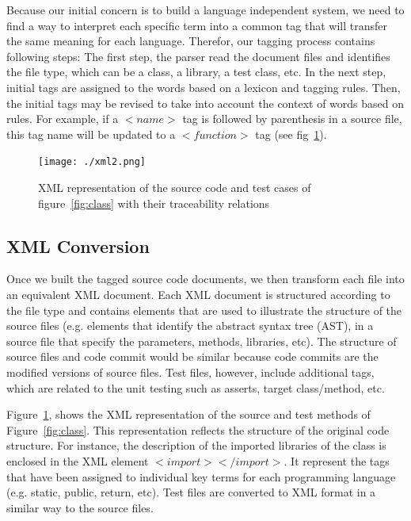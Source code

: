 Because our initial concern is to build a language independent 
system, we need to find a way to interpret each specific term 
into a common tag that will transfer the same meaning for each language. 
Therefor, our tagging process contains following steps:
The first step, the parser read the document files and identifies 
the file type, which can be a class, a library, a test class, etc.
In the next step, initial tags are assigned to the words based on
a lexicon and tagging rules. Then, the initial tags may be revised to 
take into account the context of words based on rules.  
For example, if a $<name>$ tag is followed by parenthesis in a
source file, this tag name will be updated to a $<function>$ tag
(see fig~\ref{fig:xml}).


\begin{figure}[!ht]
	\centering
	\texttt{[image: ./xml2.png]}
	\vspace*{-3pt}
	\caption{XML representation of the source code and test 
		cases of figure~\ref{fig:class} with their traceability relations}
	\label{fig:xml}
\end{figure}


\subsection{XML Conversion}

Once we built the tagged source code documents, we then 
transform each file into an equivalent XML document. 
Each XML document is structured according to the file type
and contains elements that are used to illustrate 
the structure of the source files 
(e.g. elements that identify the abstract syntax tree (AST),
in a source file that specify the 
parameters, methods, libraries, etc). 
The structure of source files and code commit would be similar 
because code commits are the modified versions of source files.
Test files, however, include additional tags, which are related to 
the unit testing such as asserts, target class/method, etc. 


Figure~\ref{fig:xml}, shows the XML representation 
of the source and test methods of Figure~\ref{fig:class}.
This representation reflects the structure of the original code structure.
For instance, the description of the
imported libraries of the class is enclosed 
in the XML element $<import> </import>$. 
It represent the tags that have been assigned 
to individual key terms for each programming language 
(e.g. static, public, return, etc).
Test files are converted to XML format in a similar way to the source files.


